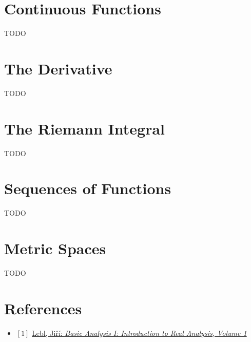 \documentclass[12pt, letterpaper, oneside]{book}
\begin{document}
%
%

\chapter{Continuous Functions}

TODO

%
%

\chapter{The Derivative}

TODO

%
%

\chapter{The Riemann Integral}

TODO

%
%

\chapter{Sequences of Functions}

TODO

%
%

\chapter{Metric Spaces}

TODO

%
%

\chapter*{References}

\begin{itemize}
  \item $[1]$ \href{https://ocw.mit.edu/courses/18-100a-real-analysis-fall-2020/resources/mit18_100af20_basic_analysis/}{Lebl, Jiří: \it{Basic Analysis I: Introduction to Real Analysis, Volume 1}}
\end{itemize}
\end{document}
